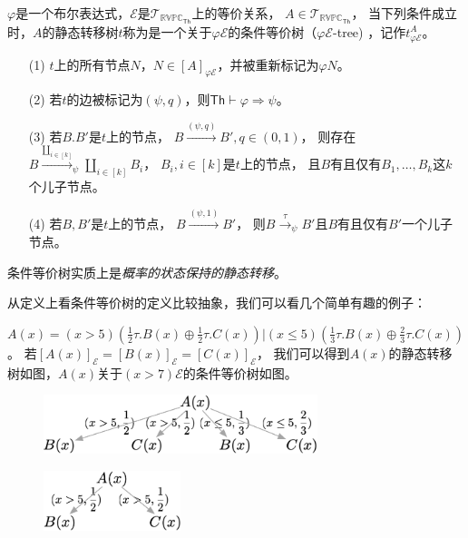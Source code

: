 \begin{definition}[条件等价树]
   $\varphi$是一个布尔表达式，$\mathcal{E}$是$\mathcal{T}_{\mathbb{RVPC}_{\mathsf{Th}}}$上的等价关系，
   $A\in \mathcal{T}_{\mathbb{RVPC}_{\mathsf{Th}}}$，
   当下列条件成立时，$A$的静态转移树$t$称为是一个关于$\varphi\mathcal{E}$的条件等价树（$\varphi \mathcal{E}$-tree) ，记作$t^A_{\varphi \mathcal{E}}$。
\begin{itemize}
   \item[(1)] $t$上的所有节点$N$，$N\in [A]_{\varphi \mathcal{E}}$，并被重新标记为$\varphi N$。
   \item[(2)] {
   若$t$的边被标记为$(\psi, q)$，则$\mathsf{Th}\vdash \varphi\Rightarrow \psi$。
   }
   \item[(3)] {
         若$B.B'$是$t$上的节点，
         $B\stackrel{(\psi,q)}{\rightarrow}B',q\in (0,1)$，
         则存在$B\stackrel{\coprod_{i\in [k]}}{\longrightarrow}_{\psi} \coprod_{i\in [k]} B_i$，
         $B_i,i\in [k]$是$t$上的节点，
         且$B$有且仅有$B_1,\dots, B_k$这$k$个儿子节点。
   }
   \item[(4)] {
      若$B,B'$是$t$上的节点，
      $B\stackrel{(\psi,1)}{\rightarrow}B'$，
      则$B\stackrel{\tau}{\rightarrow}_{\psi}B'$且$B$有且仅有$B'$一个儿子节点。
   }
\end{itemize}
\end{definition}

条件等价树实质上是\textit{概率的状态保持的静态转移}。

从定义上看条件等价树的定义比较抽象，我们可以看几个简单有趣的例子：

\begin{example}\label{eg:conditional}
   $A(x)=(x>5)(\frac{1}{2}\tau.B(x)\oplus\frac{1}{2}\tau.C(x))|(x\leq 5)(\frac{1}{3}\tau.B(x)\oplus\frac{2}{3}\tau.C(x))$。
   若$[A(x)]_{\mathcal{E}}=[B(x)]_{\mathcal{E}}=[C(x)]_{\mathcal{E}}$，
   我们可以得到$A(x)$的静态转移树如图\label{fig:eg_condition}，$A(x)$关于$(x>7)\mathcal{E}$的条件等价树如图\label{fig:eg_condition2}。
   \begin{figure}[!htbp]
      \small
      \centering
      \includegraphics[width=8cm]{../figure/example_condition.png}
      \caption[]{}
      \label{fig:eg_condition}
   \end{figure}
   \begin{figure}[!htbp]
      \small
      \centering
      \includegraphics[width=4cm]{../figure/example_condition2.png}
      \caption[]{}
      \label{fig:eg_condition2}
   \end{figure}
\end{example}

